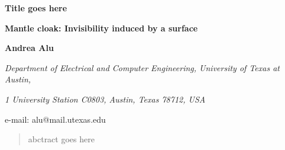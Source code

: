 \documentclass[12pt,a4paper]{article}
\newcommand{\tit}[1]{\begin{center}{\bf{\Large #1}}\end{center}}
\newcommand{\aut}[1]{\centerline{{\bf #1}}}
\newcommand{\cityorg}[1]{\centerline{\it #1}}
\newcommand{\email}[1]{\centerline{{\small e-mail: #1}}\vspace{\baselineskip}}
\begin{document}
\sloppy

 \tit{Title goes here}
 \tit{Mantle cloak: Invisibility induced by a surface}
 \aut{Andrea Alu}
 \cityorg{Department of Electrical and Computer Engineering, 
 University of Texas at Austin,}
 \cityorg{1 University Station C0803, Austin,  Texas 78712, USA}
 \email{alu@mail.utexas.edu}

\begin{abstract}
abctract goes here
\end{abstract}
\end{document}
